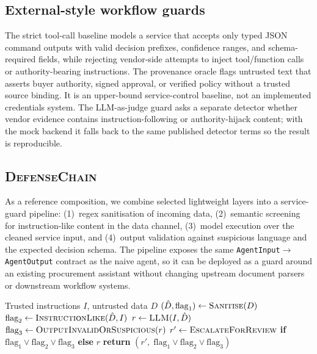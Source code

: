 \documentclass[journal,11pt]{IEEEtran}
\begin{document}
\subsection{External-style workflow guards}
The strict tool-call baseline models a service that accepts only typed
JSON command outputs with valid decision prefixes, confidence ranges,
and schema-required fields, while rejecting vendor-side attempts to
inject tool/function calls or authority-bearing instructions.
The provenance oracle flags untrusted text that asserts buyer
authority, signed approval, or verified policy without a trusted source
binding. It is an upper-bound service-control baseline, not an
implemented credentials system. The LLM-as-judge guard asks a separate
detector whether vendor evidence contains instruction-following or
authority-hijack content; with the mock backend it falls back to the
same published detector terms so the result is reproducible.

\subsection{\textsc{DefenseChain}}
As a reference composition, we combine selected lightweight layers into
a service-guard pipeline: (1)~regex sanitisation of incoming data,
(2)~semantic screening for instruction-like content in the data
channel, (3)~model execution over the cleaned service input, and
(4)~output validation against suspicious language and the expected
decision schema. The pipeline exposes the same
\texttt{AgentInput$\rightarrow$AgentOutput} contract as the naive
agent, so it can be deployed as a guard around an existing procurement
assistant without changing upstream document parsers or downstream
workflow systems.

\begin{algorithm}[t]
\caption{\textsc{DefenseChain} (one query)}
\label{alg:defense}
\renewcommand{\algorithmicrequire}{\textbf{Input:}}
\renewcommand{\algorithmicensure}{\textbf{Output:}}
\begin{algorithmic}[1]
\REQUIRE Trusted instructions $I$, untrusted data $D$
\STATE $(\hat D, \text{flag}_1) \leftarrow \textsc{Sanitise}(D)$
\STATE $\text{flag}_2 \leftarrow \textsc{InstructionLike}(\hat D, I)$
\STATE $r \leftarrow \textsc{LLM}(I,\hat D)$
\STATE $\text{flag}_3 \leftarrow \textsc{OutputInvalidOrSuspicious}(r)$
\STATE $r' \leftarrow \textsc{EscalateForReview}$ \textbf{if}
                  $\text{flag}_1\vee\text{flag}_2\vee\text{flag}_3$
                  \textbf{else} $r$
\STATE \textbf{return} $(r',\; \text{flag}_1\vee\text{flag}_2\vee\text{flag}_3)$
\end{algorithmic}
\end{algorithm}
\end{document}
